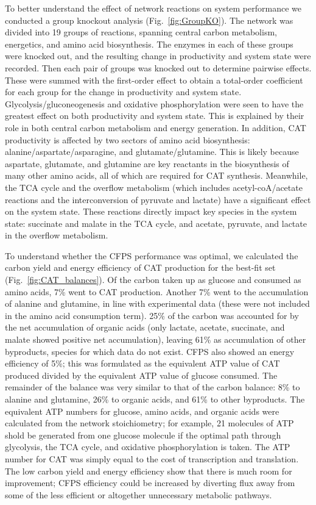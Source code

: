 \documentclass[12pt]{article}
\begin{document}
To better understand the effect of network reactions on system performance we conducted a group knockout analysis (Fig.~\ref{fig:GroupKO}).
The network was divided into 19 groups of reactions, spanning central carbon metabolism, energetics, and amino acid biosynthesis.
The enzymes in each of these groups were knocked out, and the resulting change in productivity and system state were recorded.
Then each pair of groups was knocked out to determine pairwise effects.
These were summed with the first-order effect to obtain a total-order coefficient for each group for the change in productivity and system state.
Glycolysis/gluconeogenesis and oxidative phosphorylation were seen to have the greatest effect on both productivity and system state.
This is explained by their role in both central carbon metabolism and energy generation.
In addition, CAT productivity is affected by two sectors of amino acid biosynthesis: alanine/aspartate/asparagine, and glutamate/glutamine.
This is likely because aspartate, glutamate, and glutamine are key reactants in the biosynthesis of many other amino acids, all of which are required for CAT synthesis.
Meanwhile, the TCA cycle and the overflow metabolism (which includes acetyl-coA/acetate reactions and the interconversion of pyruvate and lactate) have a significant effect on the system state.
These reactions directly impact key species in the system state: succinate and malate in the TCA cycle, and acetate, pyruvate, and lactate in the overflow metabolism.

To understand whether the CFPS performance was optimal, we calculated the carbon yield and energy efficiency of CAT production for the best-fit set (Fig.~\ref{fig:CAT_balances}).
Of the carbon taken up as glucose and consumed as amino acids, 7\% went to CAT production.
Another 7\% went to the accumulation of alanine and glutamine, in line with experimental data (these were not included in the amino acid consumption term).
25\% of the carbon was accounted for by the net accumulation of organic acids (only lactate, acetate, succinate, and malate showed positive net accumulation), leaving 61\% as accumulation of other byproducts, species for which data do not exist.
CFPS also showed an energy efficiency of 5\%; this was formulated as the equivalent ATP value of CAT produced divided by the equivalent ATP value of glucose consumed.
The remainder of the balance was very similar to that of the carbon balance: 8\% to alanine and glutamine, 26\% to organic acids, and 61\% to other byproducts.
The equivalent ATP numbers for glucose, amino acids, and organic acids were calculated from the network stoichiometry; for example, 21 molecules of ATP shold be generated from one glucose molecule if the optimal path through glycolysis, the TCA cycle, and oxidative phosphorylation is taken.
The ATP number for CAT was simply equal to the cost of transcription and translation.
The low carbon yield and energy efficiency show that there is much room for improvement; CFPS efficiency could be increased by diverting flux away from some of the less efficient or altogether unnecessary metabolic pathways.
\end{document}
